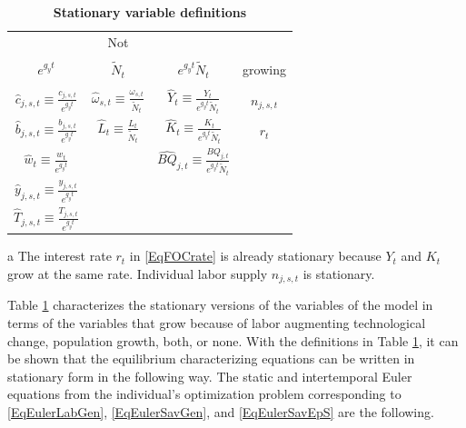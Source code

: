 \begin{spacing}{1.5}
    \begin{table}[htbp] \centering \captionsetup{width=3.3in}
    \caption{\label{TabStatVars}\textbf{Stationary variable definitions}}
      \begin{threeparttable}
      \begin{tabular}{>{\small}c >{\small}c >{\small}c |>{\small}c}
        \hline\hline
        \multicolumn{3}{c}{Sources of growth} & Not \\
        & & & \\[-4mm]
        $e^{g_y t}$ & $\tilde{N}_t$ & $e^{g_y t}\tilde{N}_t$ & growing\tnote{a} \\
        \hline
        & & \\[-4mm]
        $\hat{c}_{j,s,t}\equiv\frac{c_{j,s,t}}{e^{g_y t}}$ & $\hat{\omega}_{s,t}\equiv\frac{\omega_{s,t}}{\tilde{N}_t}$ & $\hat{Y}_t\equiv\frac{Y_t}{e^{g_y t}\tilde{N}_t}$ & $n_{j,s,t}$ \\[2mm]
        $\hat{b}_{j,s,t}\equiv\frac{b_{j,s,t}}{e^{g_y t}}$ & $\hat{L}_t\equiv\frac{L_t}{\tilde{N}_t}$ & $\hat{K}_t\equiv\frac{K_t}{e^{g_y t}\tilde{N}_t}$ & $r_t$ \\[2mm]
        $\hat{w}_t\equiv\frac{w_t}{e^{g_y t}}$ &  & $\hat{BQ}_{j,t}\equiv\frac{BQ_{j,t}}{e^{g_y t}\tilde{N}_t}$ &  \\[2mm]
        $\hat{y}_{j,s,t}\equiv\frac{y_{j,s,t}}{e^{g_y t}}$ &  &  &  \\[2mm]
        $\hat{T}_{j,s,t}\equiv\frac{T_{j,s,t}}{e^{g_y t}}$ &  &  &  \\[2mm]
        \hline\hline
      \end{tabular}
      \begin{tablenotes}
        \scriptsize{\item[a]The interest rate $r_t$ in \eqref{EqFOCrate} is already stationary because $Y_t$ and $K_t$ grow at the same rate. Individual labor supply $n_{j,s,t}$ is stationary.}
      \end{tablenotes}
      \end{threeparttable}
    \end{table}

    Table \ref{TabStatVars} characterizes the stationary versions of the variables of the model in terms of the variables that grow because of labor augmenting technological change, population growth, both, or none. With the definitions in Table \ref{TabStatVars}, it can be shown that the equilibrium characterizing equations can be written in stationary form in the following way. The static and intertemporal Euler equations from the individual's optimization problem corresponding to \eqref{EqEulerLabGen}, \eqref{EqEulerSavGen}, and \eqref{EqEulerSavEpS} are the following.


\end{spacing}
